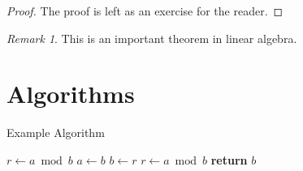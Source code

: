 \documentclass[11pt]{article}
\theoremstyle{definition}
\theoremstyle{remark}
\newtheorem*{remark}{Remark}
\theoremstyle{plain}
\begin{document}
\begin{proof}
    The proof is left as an exercise for the reader.
\end{proof}

\begin{remark}
    This is an important theorem in linear algebra.
\end{remark}

\section{Algorithms}
\begin{algorithm}
\caption{Example Algorithm}
\begin{algorithmic}[1]
    \State $r \gets a \bmod b$
        \State $a \gets b$
        \State $b \gets r$
        \State $r \gets a \bmod b$
    \EndWhile
    \State \textbf{return} $b$
\EndProcedure
\end{algorithmic}
\end{algorithm}
\end{document}
